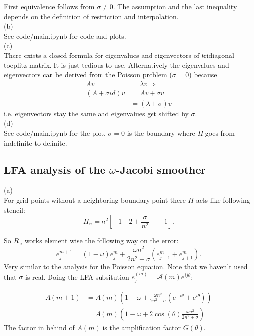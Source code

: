 \documentclass[a4paper,12pt]{article}
\begin{document}
First equivalence follows from $\sigma \neq 0$. The assumption and the last inequality depends on the definition of
restriction and interpolation. \\
(b) \\
See code/main.ipynb for code and plots. \\
(c) \\
There exists a closed formula for eigenvalues and eigenvectors of tridiagonal toeplitz matrix. It is just tedious to
use. Alternatively the eigenvalues and eigenvectors can be derived from the Poisson problem ($\sigma=0$) because
\begin{align*}
    Av             & = \lambda v \Rightarrow \\
    (A+\sigma id)v & = Av + \sigma v         \\
                   & = (\lambda+\sigma)v
\end{align*}
i.e. eigenvectors stay the same and eigenvalues get shifted by $\sigma$. \\

(d) \\
See code/main.ipynb for the plot. $\sigma = 0$ is the boundary where $H$ goes from indefinite to definite.

\subsection{LFA analysis of the $\omega$-Jacobi smoother}
(a) \\
For grid points without a neighboring boundary point there
$H$ acts like following stencil:
\[
    H_n = n^{2} [ -1 \quad 2+ \frac{\sigma}{n^{2}}  \quad -1]
    .\]

So $R_{\omega}$ works element wise the following way on the error:
\begin{equation}
    e_{j}^{m+1} = (1-\omega) e_{j} ^{m} + \frac{\omega n^{2}}{2 n^{2} + \sigma} (e_{j-1} ^{m} + e_{j+1}^{m})
    .
\end{equation}
Very similar to the analysis for the Poisson equation. Note that we haven't used that $\sigma$ is real.
Doing the LFA subsitution $e_j^{(m)}=\mathcal{A}(m) e^{i j \theta}$:

\begin{align*}
    A(m+1) & = A(m) \left( 1-\omega + \frac{\omega n^{2}}{2 n^{2} + \sigma} (e^{-i\theta} + e^{i\theta}) \right) \\
           & = A(m) \left( 1-\omega + 2 \cos(\theta) \frac{\omega n^{2}}{2 n^{2} + \sigma}   \right)
\end{align*}
The factor in behind of $A(m)$ is the amplification factor $G(\theta)$.
\end{document}

